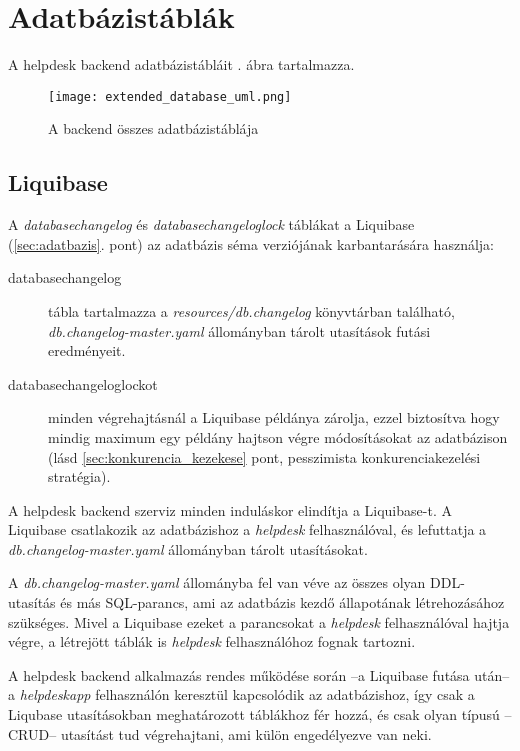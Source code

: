 \section{Adatbázistáblák}
A helpdesk backend adatbázistábláit . ábra tartalmazza.

\begin{figure}[hbt] 
	\centering
	\texttt{[image: extended\_database\_uml.png]}
	\caption{A backend összes adatbázistáblája}
	\label{fig:extended_database_uml}
\end{figure}


\subsection{Liquibase}\label{sec:liquibase}
A \textit{databasechangelog} és \textit{databasechangeloglock} táblákat a Liquibase (\ref{sec:adatbazis}. pont) az adatbázis séma verziójának karbantarására használja:
\begin{description}
	\item[databasechangelog] tábla tartalmazza a \mbox{\textit{resources/db.changelog}} könyvtárban található,  \mbox{\textit{db.changelog-master.yaml}} állományban tárolt utasítások futási eredményeit.
	
	\item[databasechangeloglockot] minden végrehajtásnál a Liquibase példánya  zárolja, ezzel biztosítva hogy mindig maximum egy példány hajtson végre módosításokat az adatbázison (lásd \ref{sec:konkurencia_kezekese} pont, pesszimista konkurenciakezelési stratégia).
\end{description}

A helpdesk backend szerviz minden induláskor elindítja a Liquibase-t. A Liquibase csatlakozik az adatbázishoz a \textit{helpdesk} felhasználóval, és lefuttatja a \mbox{\textit{db.changelog-master.yaml}} állományban tárolt utasításokat.

A \mbox{\textit{db.changelog-master.yaml}} állományba fel van véve az összes olyan DDL-utasítás és más SQL-parancs, ami az adatbázis kezdő állapotának létrehozásához szükséges. Mivel a Liquibase ezeket a parancsokat a \textit{helpdesk} felhasználóval hajtja végre, a létrejött táblák is \textit{helpdesk} felhasználóhoz fognak tartozni. 

A helpdesk backend alkalmazás rendes működése során --a Liquibase futása után-- a \textit{helpdesk\textunderscore app} felhasználón keresztül kapcsolódik az adatbázishoz, így csak a Liqubase utasításokban meghatározott táblákhoz fér hozzá, és csak olyan típusú --CRUD-- utasítást tud végrehajtani, ami külön engedélyezve van neki.

